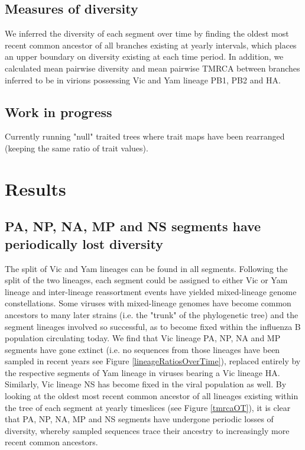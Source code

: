 \documentclass[11pt,oneside,letterpaper]{article}
\begin{document}
\subsection*{Measures of diversity}
We inferred the diversity of each segment over time by finding the oldest most recent common ancestor of all branches existing at yearly intervals, which places an upper boundary on diversity existing at each time period.
In addition, we calculated mean pairwise diversity and mean pairwise TMRCA between branches inferred to be in virions possessing Vic and Yam lineage PB1, PB2 and HA.


\subsection*{Work in progress}
Currently running "null" traited trees where trait maps have been rearranged (keeping the same ratio of trait values).


\section*{Results}

\subsection*{PA, NP, NA, MP and NS segments have periodically lost diversity}
The split of Vic and Yam lineages can be found in all segments.
Following the split of the two lineages, each segment could be assigned to either Vic or Yam lineage and inter-lineage reassortment events have yielded mixed-lineage genome constellations.
Some viruses with mixed-lineage genomes have become common ancestors to many later strains (i.e. the "trunk" of the phylogenetic tree) and the segment lineages involved so successful, as to become fixed within the influenza B population circulating today.
We find that Vic lineage PA, NP, NA and MP segments have gone extinct (i.e. no sequences from those lineages have been sampled in recent years see Figure \ref{lineageRatiosOverTime}), replaced entirely by the respective segments of Yam lineage in viruses bearing a Vic lineage HA.
Similarly, Vic lineage NS has become fixed in the viral population as well.
By looking at the oldest most recent common ancestor of all lineages existing within the tree of each segment at yearly timeslices (see Figure \ref{tmrcaOT}), it is clear that PA, NP, NA, MP and NS segments have undergone periodic losses of diversity, whereby sampled sequences trace their ancestry to increasingly more recent common ancestors.
\end{document}

